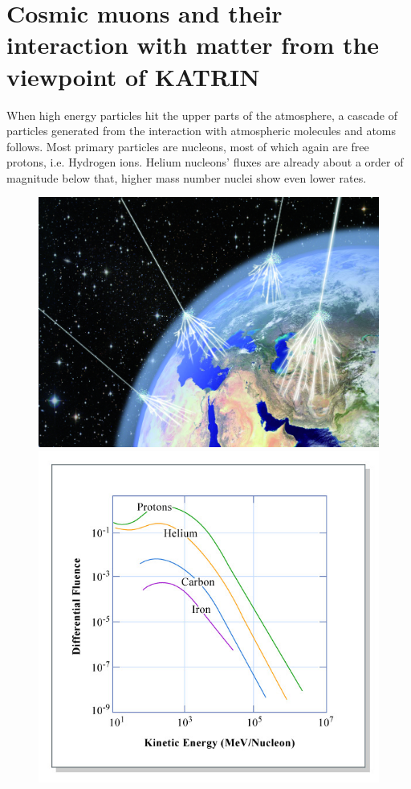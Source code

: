    
    \section{Cosmic muons and their interaction with matter from the viewpoint of KATRIN}
    \label{ch:introduction:sec:Cosmic Air Showers}
    When high energy particles hit the upper parts of the atmosphere, a cascade of particles generated from the interaction with atmospheric molecules and atoms follows. Most primary particles are nucleons, most of which again are free protons, i.e. Hydrogen ions. Helium nucleons' fluxes are already about a order of magnitude below that, higher mass number nuclei show even lower rates\cite{highEnergyCosmicRays}. 
    \begin{figure}
	\begin{minipage}[d]{0.49 \textwidth}
		  \includegraphics[width=\textwidth]{graphics/cosmicRays/cosmicRays.jpg}
	\end{minipage}
	\begin{minipage}[d]{0.49 \textwidth}
		  \includegraphics[width=\textwidth]{graphics/cosmicRays/energySpectrum.jpg}

\end{minipage}
\end{figure}
